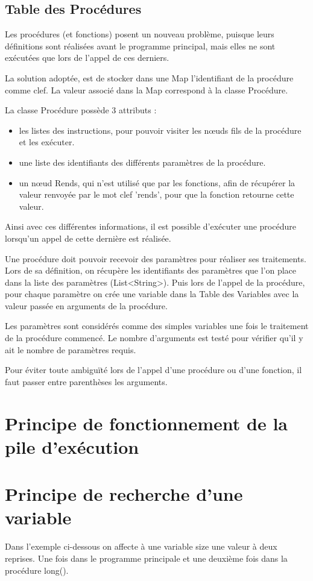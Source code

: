 \documentclass[a4paper,11pt]{article}
\begin{document}
\subsection{Table des Procédures}
Les procédures (et fonctions) posent un nouveau problème, puisque leurs définitions sont réalisées avant le programme principal, mais elles ne sont exécutées que lors de l'appel de ces derniers.

La solution adoptée, est de stocker dans une Map l'identifiant de la procédure comme clef. La valeur associé dans la Map correspond à la classe Procédure.

La classe Procédure possède 3 attributs :
\begin{itemize}
\item les listes des instructions, pour pouvoir visiter les nœuds fils de la procédure et les exécuter.
\item une liste des identifiants des différents paramètres de la procédure.   
\item un nœud Rends, qui n'est utilisé que par les fonctions, afin de récupérer la valeur renvoyée par le mot clef 'rends', pour que la fonction retourne cette valeur.
\end{itemize} 


Ainsi avec ces différentes informations, il est possible d'exécuter une procédure lorsqu'un appel de cette dernière est réalisée.

Une procédure doit pouvoir recevoir des paramètres pour réaliser ses traitements.
Lors de sa définition, on récupère les identifiants des paramètres que l'on place dans la liste des paramètres (List<String>). 
Puis lors de l'appel de la procédure, pour chaque paramètre on crée une variable dans la Table des Variables avec la valeur passée en arguments de la procédure. 

Les paramètres sont considérés comme des simples variables une fois le traitement de la procédure commencé.
Le nombre d'arguments est testé pour vérifier qu'il y ait le nombre de paramètres requis.

Pour éviter toute ambiguïté lors de l'appel d'une procédure ou d'une fonction, il faut passer entre parenthèses les arguments.  

\section{Principe de fonctionnement de la pile d'exécution}


\section{Principe de recherche d'une variable}
Dans l'exemple ci-dessous on affecte à une variable size une valeur à deux reprises. Une fois dans le programme principale et une deuxième fois dans la procédure long().
\end{document}
